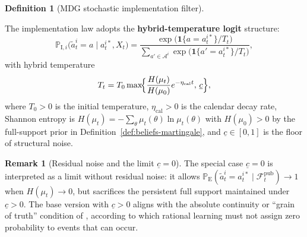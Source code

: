 \documentclass[12pt]{article}
\numberwithin{equation}{section}
\numberwithin{table}{section}
\theoremstyle{definition}
\newtheorem{definition}[theorem]{Definition}
\newtheorem{remark}[theorem]{Remark}
\newcommand{\ProbE}{\mathbb{P}_{\mathrm{E}}}
\newcommand{\ProbI}[1]{\mathbb{P}_{\mathrm{I},#1}}
\begin{document}
\begin{definition}[MDG stochastic implementation filter]
\begin{enumerate}
\end{enumerate}
The implementation law adopts the \textbf{hybrid-temperature logit}
structure:
\begin{equation}
\label{eq:logit-hybrid}
\ProbI{i}\bigl(\tilde{a}_t^i=a\mid a_t^{i\ast},X_t\bigr)
=\frac{\exp\bigl(\mathbf{1}\{a=a_t^{i\ast}\}/T_t\bigr)}
      {\sum_{a'\in\mathcal{A}^i}\exp\bigl(\mathbf{1}\{a'=a_t^{i\ast}\}/T_t\bigr)},
\end{equation}
with hybrid temperature
\begin{equation}
\label{eq:temperatura-piso}
T_t = T_0\max\!\Bigl\{\frac{H(\mu_t)}{H(\mu_0)}e^{-\eta_{\mathrm{cal}}t},\,\underline{c}\Bigr\},
\end{equation}
where $T_0>0$ is the initial temperature, $\eta_{\mathrm{cal}}>0$ is the
calendar decay rate, Shannon entropy is
$H(\mu_t)=-\sum_\theta\mu_t(\theta)\ln\mu_t(\theta)$ with
$H(\mu_0)>0$ by the full-support prior in
Definition~\ref{def:beliefs-martingale}, and
$\underline{c}\in[0,1]$ is the floor of structural noise.
\end{definition}

\begin{remark}[Residual noise and the limit $\underline{c}=0$]
\label{rem:mdg-floor}
The special case $\underline{c}=0$ is interpreted as a limit without residual
noise: it allows
$\ProbE(\tilde{a}_t^i=a_t^{i\ast}\mid\mathcal{F}_t^{\mathrm{pub}})\to 1$
when $H(\mu_t)\to 0$, but sacrifices the persistent full support maintained
under $\underline{c}>0$. The base version with $\underline{c}>0$ aligns with
the absolute continuity or ``grain of truth'' condition of
\citet{KalaiLehrer1993}, according to which rational learning must not assign
zero probability to events that can occur.
\end{remark}
\end{document}
